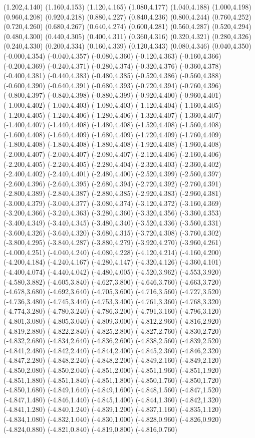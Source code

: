 (1.202,4.140) (1.160,4.153) (1.120,4.165) (1.080,4.177) (1.040,4.188) (1.000,4.198) (0.960,4.208) (0.920,4.218) (0.880,4.227) (0.840,4.236) (0.800,4.244) (0.760,4.252) (0.720,4.260) (0.680,4.267) (0.640,4.274) (0.600,4.281) (0.560,4.287) (0.520,4.294) (0.480,4.300) (0.440,4.305) (0.400,4.311) (0.360,4.316) (0.320,4.321) (0.280,4.326) (0.240,4.330) (0.200,4.334) (0.160,4.339) (0.120,4.343) (0.080,4.346) (0.040,4.350) (-0.000,4.354) (-0.040,4.357) (-0.080,4.360) (-0.120,4.363) (-0.160,4.366) (-0.200,4.369) (-0.240,4.371) (-0.280,4.374) (-0.320,4.376) (-0.360,4.378) (-0.400,4.381) (-0.440,4.383) (-0.480,4.385) (-0.520,4.386) (-0.560,4.388) (-0.600,4.390) (-0.640,4.391) (-0.680,4.393) (-0.720,4.394) (-0.760,4.396) (-0.800,4.397) (-0.840,4.398) (-0.880,4.399) (-0.920,4.400) (-0.960,4.401) (-1.000,4.402) (-1.040,4.403) (-1.080,4.403) (-1.120,4.404) (-1.160,4.405) (-1.200,4.405) (-1.240,4.406) (-1.280,4.406) (-1.320,4.407) (-1.360,4.407) (-1.400,4.407) (-1.440,4.408) (-1.480,4.408) (-1.520,4.408) (-1.560,4.408) (-1.600,4.408) (-1.640,4.409) (-1.680,4.409) (-1.720,4.409) (-1.760,4.409) (-1.800,4.408) (-1.840,4.408) (-1.880,4.408) (-1.920,4.408) (-1.960,4.408) (-2.000,4.407) (-2.040,4.407) (-2.080,4.407) (-2.120,4.406) (-2.160,4.406) (-2.200,4.405) (-2.240,4.405) (-2.280,4.404) (-2.320,4.403) (-2.360,4.402) (-2.400,4.402) (-2.440,4.401) (-2.480,4.400) (-2.520,4.399) (-2.560,4.397) (-2.600,4.396) (-2.640,4.395) (-2.680,4.394) (-2.720,4.392) (-2.760,4.391) (-2.800,4.389) (-2.840,4.387) (-2.880,4.385) (-2.920,4.383) (-2.960,4.381) (-3.000,4.379) (-3.040,4.377) (-3.080,4.374) (-3.120,4.372) (-3.160,4.369) (-3.200,4.366) (-3.240,4.363) (-3.280,4.360) (-3.320,4.356) (-3.360,4.353) (-3.400,4.349) (-3.440,4.345) (-3.480,4.340) (-3.520,4.336) (-3.560,4.331) (-3.600,4.326) (-3.640,4.320) (-3.680,4.315) (-3.720,4.308) (-3.760,4.302) (-3.800,4.295) (-3.840,4.287) (-3.880,4.279) (-3.920,4.270) (-3.960,4.261) (-4.000,4.251) (-4.040,4.240) (-4.080,4.228) (-4.120,4.214) (-4.160,4.200) (-4.200,4.184) (-4.240,4.167) (-4.280,4.147) (-4.320,4.126) (-4.360,4.101) (-4.400,4.074) (-4.440,4.042) (-4.480,4.005) (-4.520,3.962) (-4.553,3.920) (-4.580,3.882) (-4.605,3.840) (-4.627,3.800) (-4.646,3.760) (-4.663,3.720) (-4.678,3.680) (-4.692,3.640) (-4.705,3.600) (-4.716,3.560) (-4.727,3.520) (-4.736,3.480) (-4.745,3.440) (-4.753,3.400) (-4.761,3.360) (-4.768,3.320) (-4.774,3.280) (-4.780,3.240) (-4.786,3.200) (-4.791,3.160) (-4.796,3.120) (-4.801,3.080) (-4.805,3.040) (-4.809,3.000) (-4.812,2.960) (-4.816,2.920) (-4.819,2.880) (-4.822,2.840) (-4.825,2.800) (-4.827,2.760) (-4.830,2.720) (-4.832,2.680) (-4.834,2.640) (-4.836,2.600) (-4.838,2.560) (-4.839,2.520) (-4.841,2.480) (-4.842,2.440) (-4.844,2.400) (-4.845,2.360) (-4.846,2.320) (-4.847,2.280) (-4.848,2.240) (-4.848,2.200) (-4.849,2.160) (-4.849,2.120) (-4.850,2.080) (-4.850,2.040) (-4.851,2.000) (-4.851,1.960) (-4.851,1.920) (-4.851,1.880) (-4.851,1.840) (-4.851,1.800) (-4.850,1.760) (-4.850,1.720) (-4.850,1.680) (-4.849,1.640) (-4.849,1.600) (-4.848,1.560) (-4.847,1.520) (-4.847,1.480) (-4.846,1.440) (-4.845,1.400) (-4.844,1.360) (-4.842,1.320) (-4.841,1.280) (-4.840,1.240) (-4.839,1.200) (-4.837,1.160) (-4.835,1.120) (-4.834,1.080) (-4.832,1.040) (-4.830,1.000) (-4.828,0.960) (-4.826,0.920) (-4.824,0.880) (-4.821,0.840) (-4.819,0.800) (-4.816,0.760) 